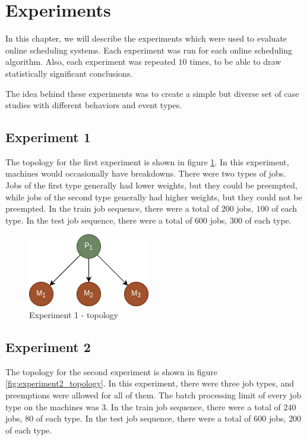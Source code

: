 \section{Experiments}
\label{sec:experiments}

In this chapter, we will describe the experiments which were used to evaluate online scheduling systems. Each experiment was run for each online scheduling algorithm. Also, each experiment was repeated $10$ times, to be able to draw statistically significant conclusions.

The idea behind these experiments was to create a simple but diverse set of case studies with different behaviors and event types.

\subsection{Experiment 1}

The topology for the first experiment is shown in figure \ref{fig:experiment1_topology}. In this experiment, machines would occasionally have breakdowns. There were two types of jobs. Jobs of the first type generally had lower weights, but they could be preempted, while jobs of the second type generally had higher weights, but they could not be preempted. In the train job sequence, there were a total of $200$ jobs, $100$ of each type. In the test job sequence, there were a total of $600$ jobs, $300$ of each type.

\begin{figure}[!htbp]
	\centering
	\includegraphics[scale=0.6]{../images/experiment1_topology.png}
	\caption{Experiment 1 - topology}
    \label{fig:experiment1_topology}
\end{figure}

\subsection{Experiment 2}

The topology for the second experiment is shown in figure \ref{fig:experiment2_topology}. In this experiment, there were three job types, and preemptions were allowed for all of them. The batch processing limit of every job type on the machines was $3$. In the train job sequence, there were a total of $240$ jobs, $80$ of each type. In the test job sequence, there were a total of $600$ jobs, $200$ of each type.

